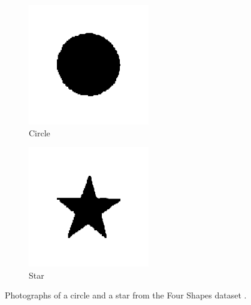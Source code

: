 \begin{figure}[ht!]
    \centering
    \begin{subfigure}[t]{0.2\textwidth}
        \includegraphics[width=\textwidth]{Figures/datasets/circle.png}
        \caption{Circle}
    \end{subfigure}
    \begin{subfigure}[t]{0.2\textwidth}
        \includegraphics[width=\textwidth]{Figures/datasets/star.png}
        \caption{Star}
    \end{subfigure}
    \caption[Photographs of a circle and a star from the Four Shapes dataset]{Photographs of a circle and a star from the Four Shapes dataset \cite{kaggleFourShapes}.}
    \label{fig:four_shapes}
\end{figure}

